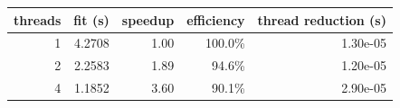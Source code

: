 \begin{tabular}{rrrrr}
\toprule
threads & fit (s) & speedup & efficiency & thread reduction (s)\\
\midrule
1 & 4.2708 & 1.00 & 100.0\% & 1.30e-05\\
2 & 2.2583 & 1.89 & 94.6\% & 1.20e-05\\
4 & 1.1852 & 3.60 & 90.1\% & 2.90e-05\\
\bottomrule
\end{tabular}
